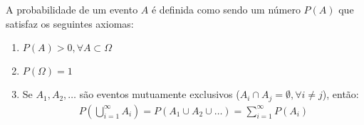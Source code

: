 A probabilidade de um evento $A$ é definida como sendo um número $P(A)$ que satisfaz
os seguintes axiomas:
\begin{enumerate}[leftmargin=*, label=\Roman*., widest=IV, align=left]
  \item $P(A) > 0, \forall A \subset \Omega$ 
  \item $P(\Omega)=1$
  \item Se $A_1, A_2,\ldots$ são eventos mutuamente exclusivos ($A_i \cap A_j = \emptyset, \forall i \neq j$), então:
    \begin{align}
      P\left(\bigcup \limits^\infty_{i=1} A_i\right)= P\left(A_1\cup A_2 \cup \ldots\right)= \sum \limits^\infty_{i=1} P\left(A_i\right) 
    \end{align}
\end{enumerate}
